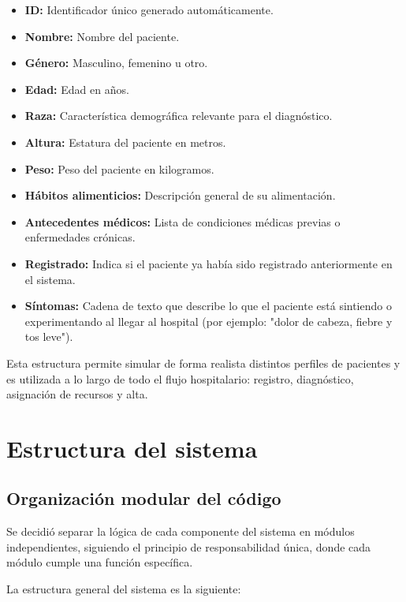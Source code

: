 \documentclass{article}
\begin{document}
\begin{itemize}
    \item \textbf{ID:} Identificador único generado automáticamente.
    \item \textbf{Nombre:} Nombre del paciente.
    \item \textbf{Género:} Masculino, femenino u otro.
    \item \textbf{Edad:} Edad en años.
    \item \textbf{Raza:} Característica demográfica relevante para el diagnóstico.
    \item \textbf{Altura:} Estatura del paciente en metros.
    \item \textbf{Peso:} Peso del paciente en kilogramos.
    \item \textbf{Hábitos alimenticios:} Descripción general de su alimentación.
    \item \textbf{Antecedentes médicos:} Lista de condiciones médicas previas o enfermedades crónicas.
    \item \textbf{Registrado:} Indica si el paciente ya había sido registrado anteriormente en el sistema.
    \item \textbf{Síntomas:} Cadena de texto que describe lo que el paciente está sintiendo o experimentando al llegar al hospital (por ejemplo: "dolor de cabeza, fiebre y tos leve").
\end{itemize}

Esta estructura permite simular de forma realista distintos perfiles de pacientes y es utilizada a lo largo de todo el flujo hospitalario: registro, diagnóstico, asignación de recursos y alta.


\section{Estructura del sistema}

\subsection{Organización modular del código}

Se decidió separar la lógica de cada componente del sistema en módulos independientes, siguiendo el principio de responsabilidad única, donde cada módulo cumple una función específica.

La estructura general del sistema es la siguiente:
\end{document}
